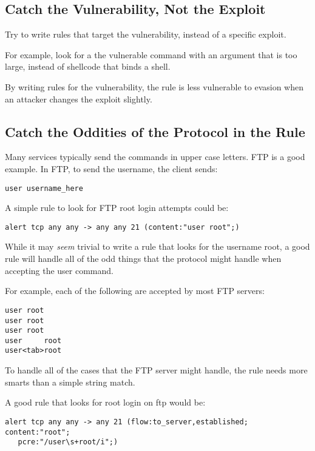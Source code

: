 \documentclass[english]{report}
\begin{document}
\subsection{Catch the Vulnerability, Not the Exploit}

Try to write rules that target the vulnerability, instead of a specific exploit.

For example, look for a the vulnerable command with an argument that is too
large, instead of shellcode that binds a shell.

By writing rules for the vulnerability, the rule is less vulnerable to evasion
when an attacker changes the exploit slightly.

\subsection{Catch the Oddities of the Protocol in the Rule}

Many services typically send the commands in upper case letters.  FTP is a good example.  In FTP, to send the username, the client sends:

\begin{verbatim}
user username_here
\end{verbatim}

A simple rule to look for FTP root login attempts could be:

\begin{verbatim}
alert tcp any any -> any any 21 (content:"user root";)
\end{verbatim}

While it may \emph{seem} trivial to write a rule that looks for the username
root, a good rule will handle all of the odd things that the protocol might
handle when accepting the user command.

For example, each of the following are accepted by most FTP servers:

\begin{verbatim}
user root
user root
user root
user     root
user<tab>root
\end{verbatim}

To handle all of the cases that the FTP server might handle, the rule needs
more smarts than a simple string match.

A good rule that looks for root login on ftp would be:

\begin{verbatim}
alert tcp any any -> any 21 (flow:to_server,established; content:"root";
   pcre:"/user\s+root/i";)
\end{verbatim}
\end{document}
